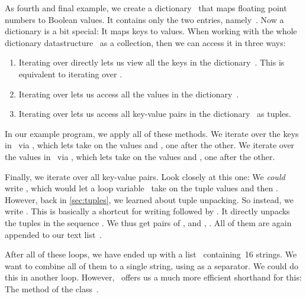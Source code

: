 As fourth and final example, we create a dictionary~ that maps floating point numbers to Boolean values.
It contains only the two entries, namely~.
Now a dictionary is a bit special:
It maps keys to values.
When working with the whole dictionary datastructure~ as a collection, then we can access it in three ways:
%
\begin{enumerate}%
%
\item Iterating over  directly lets us view all the keys in the dictionary~. %
This is equivalent to iterating over .%
%
\item Iterating over  lets us access all the values in the dictionary~.%
%
\item Iterating over  lets us access all key-value pairs in the dictionary~ as tuples.%
\end{enumerate}%
%
In our example program, we apply all of these methods.
We iterate over the keys in~ via , which lets  take on the values  and , one after the other.
We iterate over the values in~ via , which lets  take on the values  and , one after the other.%
%
\begin{sloppypar}%
Finally, we iterate over all key-value pairs.
Look closely at this one:
We \emph{could} write , which would let a loop variable~ take on the tuple values  and then .
However, back in \cref{sec:tuples}, we learned about tuple unpacking.
So instead, we write .
This is basically a shortcut for writing  followed by .
It directly unpacks the tuples in the sequence .
We thus get pairs of ,  and , .
All of them are again appended to our text list~.%
\end{sloppypar}%
%
After all of these loops, we have ended up with a list~ containing~16 strings.
We want to combine all of them to a single string, using  as a separator.
We could do this in another loop.
However, \python\ offers us a much more efficient shorthand for this:
The method  of the class~.

